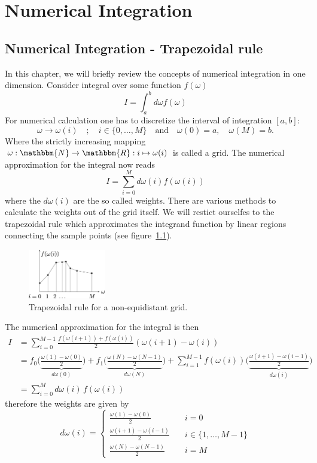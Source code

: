 \chapter{Numerical Integration}\label{chapter:numerical_integraion}
\section{Numerical Integration - Trapezoidal rule}
In this chapter, we will briefly review the concepts of numerical integration in one dimension. Consider integral over some function $f(\omega)$
\begin{equation}
	I=\int_a^b d\omega f(\omega)
\end{equation}
For numerical calculation one has to discretize the interval of integration $[a,b]$:
\[
	\omega \to \omega(i) \quad;\quad i\in\{0,\dots,M\}\quad\text{and}\quad \omega(0)=a,\quad \omega(M)=b.
\]
Where the strictly increasing mapping $\omega: \mathbbm{N} \to \mathbbm{R}: i \mapsto \omega(i)$ is called a grid. The numerical approximation for the integral now reads
\begin{equation} 
	I=\sum_{i=0}^M d\omega(i) f(\omega(i))
\end{equation}
where the $d\omega(i)$ are the so called weights. There are various methods to calculate the weights out of the grid itself. We will restict ourselfes to the trapezoidal rule which approximates the integrand function by linear regions connecting the sample points (see figure~\ref{fig:trapezoidal_rule}).
\begin{figure}[ht]
	\centering
	\includegraphics[width=0.3\textwidth]{pics/trapez.eps}
	\caption{Trapezoidal rule for a non-equidistant grid.}
	\label{fig:trapezoidal_rule}
\end{figure}

The numerical approximation for the integral is then
\begin{align*}
	I&=\sum_{i=0}^{M-1} \frac{f(\omega(i+1)) + f(\omega(i))}{2} (\omega(i+1)-\omega(i)) \\
	&=f_0\biggl( \underbrace{\frac{\omega(1)-\omega(0)}{2}}_{d\omega(0)}\biggr) + f_1 \biggl( \underbrace{\frac{\omega(N)-\omega(N-1)}{2}}_{d\omega(N)}\biggr) + \sum_{i=1}^{M-1} f(\omega(i)) \biggl( \underbrace{\frac{\omega(i+1)-\omega(i-1)}{2}}_{d\omega(i)}\biggr)\\
	&=\sum_{i=0}^{M} d\omega(i)\,f(\omega(i))
\end{align*}
therefore the weights are given by
\[
	d\omega(i)=\begin{cases}
		\frac{\omega(1)-\omega(0)}{2} \quad &i=0\\
		\frac{\omega(i+1)-\omega(i-1)}{2} \quad &i\in \{1,\dots,M-1\}  \\
		\frac{\omega(N)-\omega(N-1)}{2} \quad &i=M
	\end{cases}
\]

